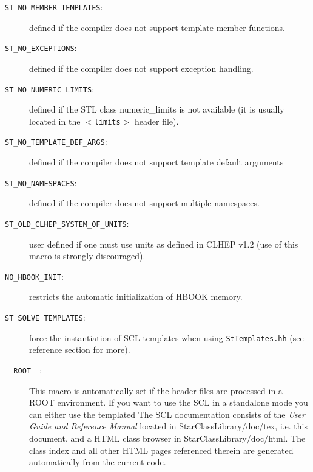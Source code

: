 \documentclass[twoside]{article}
\newcommand{\name}[1]{\textsf{#1}}%
\newcommand{\comp}[1]{\texttt{#1}}%
\begin{document}
\begin{description}
\item[\comp{ST\_NO\_MEMBER\_TEMPLATES}:] defined if the compiler does
    not support template member functions.
\item[\comp{ST\_NO\_EXCEPTIONS}:] defined if the compiler does not
    support exception handling. 
\item[\comp{ST\_NO\_NUMERIC\_LIMITS}:] defined if the STL class
    \name{numeric\_limits} is not available (it is usually located in
    the $<$\comp{limits}$>$ header file).
\item[\comp{ST\_NO\_TEMPLATE\_DEF\_ARGS}:] defined if the compiler
    does not support template default arguments
\item[\comp{ST\_NO\_NAMESPACES}:] defined if the compiler does not
    support multiple namespaces.
\item[\comp{ST\_OLD\_CLHEP\_SYSTEM\_OF\_UNITS}:] user defined if one
    must use units as defined in CLHEP v1.2 (use of this macro is
    strongly discouraged).
\item[\comp{NO\_HBOOK\_INIT}:] restricts the automatic initialization
    of HBOOK memory.
\item[\comp{ST\_SOLVE\_TEMPLATES}:] force the instantiation of SCL
    templates when using \texttt{StTemplates.hh} (see reference
    section for more).
\item[\comp{\_\_ROOT\_\_}:] This macro is automatically set if the
    header files are processed in a ROOT environment. If you want to
    use the SCL in a standalone mode you can either use the templated
The SCL documentation consists of the {\em User Guide and
    Reference Manual} located in \name{StarClassLibrary/doc/tex}, i.e.
this document, and a \name{HTML} class browser in
\name{StarClassLibrary/doc/html}.
The class index and all other \name{HTML} pages referenced therein are generated
automatically from the current code. 


\end{description}
\end{document}
